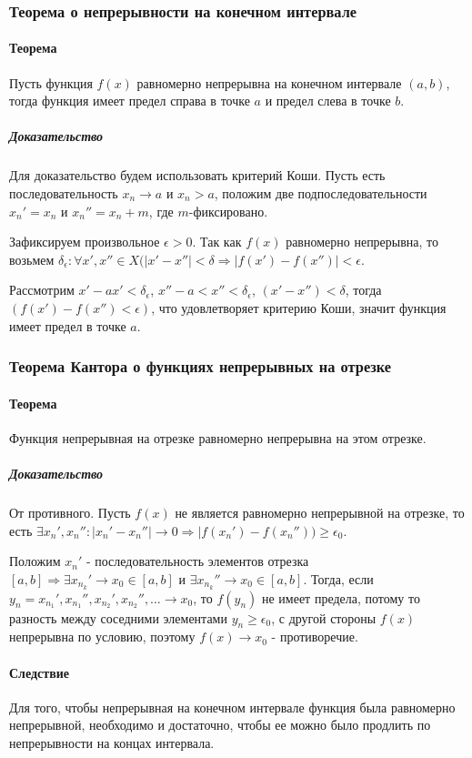 \documentclass[10pt]{article}
\begin{document}
			\subsubsection{Теорема о непрерывности на конечном интервале}
			\paragraph{Теорема}
			Пусть функция $f(x)$ равномерно непрерывна на конечном интервале $(a, b)$, тогда функция имеет предел справа в точке $a$ и предел слева в точке $b$.
			
			\subparagraph{Доказательство}
			Для доказательство будем использовать критерий Коши. Пусть есть последовательность $x_n \to a$ и $x_n > a$, положим две подпоследовательности $x_n' = x_n$ и $x_n'' = x_n + m$, где $m$-фиксировано.
			
			Зафиксируем произвольное $\epsilon > 0$. Так как $f(x)$ равномерно непрерывна, то возьмем $\delta_\epsilon : \forall x',x'' \in X (|x' - x''| < \delta \Rightarrow |f(x') - f(x'')| < \epsilon$.
			
			Рассмотрим $x' - ax' < \delta_\epsilon$, $x'' - a < x'' < \delta_\epsilon$, $(x' - x'') < \delta$, тогда $(f(x') - f(x'') < \epsilon)$, что удовлетворяет критерию Коши, значит функция имеет предел в точке $a$.
			
			\subsubsection{Теорема Кантора о функциях непрерывных на отрезке}
			\paragraph{Теорема}
			Функция непрерывная на отрезке равномерно непрерывна на этом отрезке.
			\subparagraph{Доказательство}
			От противного. Пусть $f(x)$ не является равномерно непрерывной на отрезке, то есть $\exists x_n', x_n'' : |x_n' - x_n''| \to 0 \Rightarrow |f(x_n') - f(x_n'')) \geq \epsilon_0$.
			
			Положим $x_n'$ - последовательность элементов отрезка $[a, b] \Rightarrow \exists x_{n_k}' \to x_0 \in [a,b]$ и $\exists x_{n_k}'' \to  x_0 \in [a, b]$. Тогда, если $y_n = x_{n_1}', x_{n_1}'', x_{n_2}', x_{n_2}'', \dots \to x_0$, то $f(y_n)$ не имеет предела, потому то разность между соседними элементами $y_n \geq \epsilon_0$, с другой стороны $f(x)$ непрерывна по условию, поэтому $f(x) \to x_0$ - противоречие.
			
			\paragraph{Следствие}
			Для того, чтобы непрерывная на конечном интервале функция была равномерно непрерывной, необходимо и достаточно, чтобы ее можно было продлить по непрерывности на концах интервала.
\end{document}
